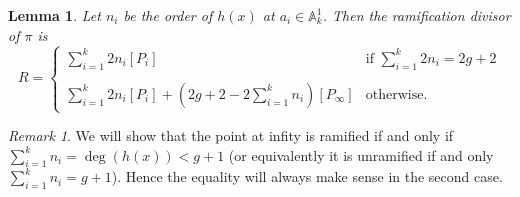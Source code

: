 \documentclass[11pt]{article} %
\newtheorem{lem}{Lemma}
\theoremstyle{remark}\newtheorem*{rem}{Remark}
\begin{document}
\begin{lem}
 Let $n_i$ be the order of $h(x)$ at $a_i\in \mathbb A_k^1$.
Then the ramification divisor of $\pi$ is
 \[
  R = \left\{ \begin{array}{ll}
               \sum_{i=1}^k 2n_i[P_i] & \mbox{if } \sum_{i=1}^k 2n_i = 2g+2 \\
		\\
               \sum_{i=1}^k 2n_i[P_i] + (2g+2-2\sum_{i=1}^kn_i)[P_{\infty}] & \mbox{otherwise.}
             \end{array} \right. \]

\end{lem}
\begin{rem}
 We will show that the point at infity is ramified if and only if $\sum_{i=1}^k n_i = \deg(h(x)) < g+1$
 (or equivalently it is unramified if and only  $\sum_{i=1}^k n_i = g+1$).
 Hence the equality will always make sense in the second case.
\end{rem}
\end{document}
